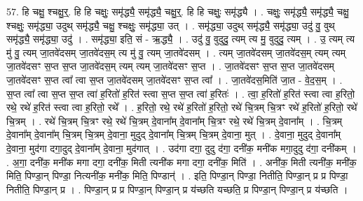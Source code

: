 \documentclass[17pt]{extarticle}
\begin{document}
57. हि चक्षु॒ श्चक्षु॒र्॒. हि हि चक्षुः॒ समृ॑द्ध्यै॒ समृ॑द्ध्यै॒ चक्षु॒र्॒. हि हि चक्षुः॒ समृ॑द्ध्यै । . चक्षुः॒ समृ॑द्ध्यै॒ समृ॑द्ध्यै॒ चक्षु॒ श्चक्षुः॒ समृ॑द्ध्या॒ उदुथ् समृ॑द्ध्यै॒ चक्षु॒ श्चक्षुः॒ समृ॑द्ध्या॒ उत् । . समृ॑द्ध्या॒ उदुथ् समृ॑द्ध्यै॒ समृ॑द्ध्या॒ उदु॑ वु॒ वुथ् समृ॑द्ध्यै॒ समृ॑द्ध्या॒ उदु॑ । . समृ॑द्ध्या॒ इति॒ सं - ऋ॒द्ध्यै॒ । . उदु॑ वु॒ वुदुदु॒ त्यम् त्य मु॒ वुदुदु॒ त्यम् । . उ॒ त्यम् त्य मु॑ वु॒ त्यम् जा॒तवे॑दसम् जा॒तवे॑दस॒म् त्य मु॑ वु॒ त्यम् जा॒तवे॑दसम् । . त्यम् जा॒तवे॑दसम् जा॒तवे॑दस॒म् त्यम् त्यम् जा॒तवे॑दसꣳ स॒प्त स॒प्त जा॒तवे॑दस॒म् त्यम् त्यम् जा॒तवे॑दसꣳ स॒प्त । . जा॒तवे॑दसꣳ स॒प्त स॒प्त जा॒तवे॑दसम् जा॒तवे॑दसꣳ स॒प्त त्वा᳚ त्वा स॒प्त जा॒तवे॑दसम् जा॒तवे॑दसꣳ स॒प्त त्वा᳚ । . जा॒तवे॑दस॒मिति॑ जा॒त - वे॒द॒स॒म् । . स॒प्त त्वा᳚ त्वा स॒प्त स॒प्त त्वा॑ ह॒रितो॑ ह॒रित॑ स्त्वा स॒प्त स॒प्त त्वा॑ ह॒रितः॑ । . त्वा॒ ह॒रितो॑ ह॒रित॑ स्त्वा त्वा ह॒रितो॒ रथे॒ रथे॑ ह॒रित॑ स्त्वा त्वा ह॒रितो॒ रथे᳚ । . ह॒रितो॒ रथे॒ रथे॑ ह॒रितो॑ ह॒रितो॒ रथे॑ चि॒त्रम् चि॒त्रꣳ रथे॑ ह॒रितो॑ ह॒रितो॒ रथे॑ चि॒त्रम् । . रथे॑ चि॒त्रम् चि॒त्रꣳ रथे॒ रथे॑ चि॒त्रम् दे॒वाना᳚म् दे॒वाना᳚म् चि॒त्रꣳ रथे॒ रथे॑ चि॒त्रम् दे॒वाना᳚म् । . चि॒त्रम् दे॒वाना᳚म् दे॒वाना᳚म् चि॒त्रम् चि॒त्रम् दे॒वाना॒ मुदुद् दे॒वाना᳚म् चि॒त्रम् चि॒त्रम् दे॒वाना॒ मुत् । . दे॒वाना॒ मुदुद् दे॒वाना᳚म् दे॒वाना॒ मुद॑गा दगा॒दुद् दे॒वाना᳚म् दे॒वाना॒ मुद॑गात् । . उद॑गा दगा॒ दुदु द॑गा॒ दनी॑क॒ मनी॑क मगा॒दुदु द॑गा॒ दनी॑कम् । . अ॒गा॒ दनी॑क॒ मनी॑क मगा दगा॒ दनी॑क॒ मिती त्यनी॑क मगा दगा॒ दनी॑क॒ मिति॑ । . अनी॑क॒ मिती त्यनी॑क॒ मनी॑क॒ मिति॒ पिण्डा॒न् पिण्डा॒ नित्यनी॑क॒ मनी॑क॒ मिति॒ पिण्डान्॑ । . इति॒ पिण्डा॒न् पिण्डा॒ नितीति॒ पिण्डा॒न् प्र प्र पिण्डा॒ नितीति॒ पिण्डा॒न् प्र । . पिण्डा॒न् प्र प्र पिण्डा॒न् पिण्डा॒न् प्र य॑च्छति यच्छति॒ प्र पिण्डा॒न् पिण्डा॒न् प्र य॑च्छति । \newline
\end{document}
